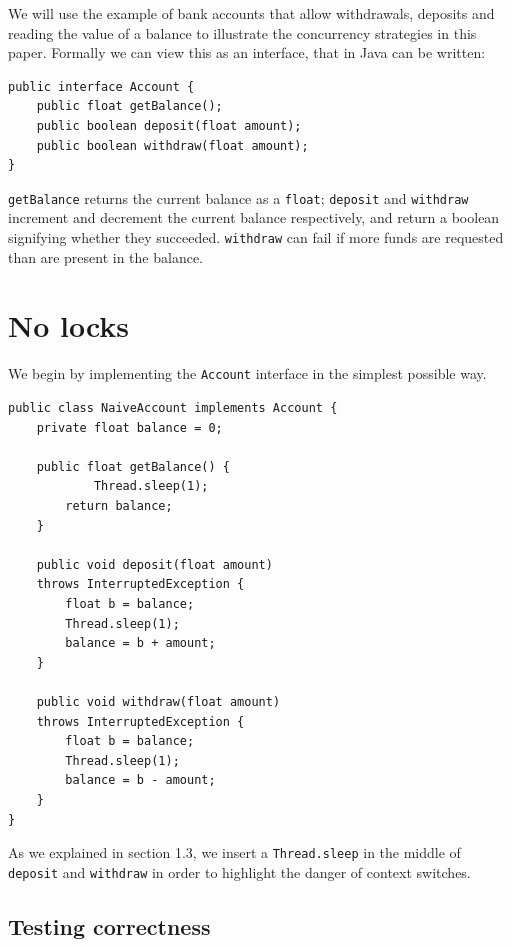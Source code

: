 \documentclass[a4paper,12pt]{kth-mag}
\begin{document}
We will use the example of bank accounts that allow withdrawals, deposits and reading the value of a balance to illustrate the concurrency strategies in this paper. Formally we can view this as an interface, that in Java can be written:

\begin{listing}[H]
	\begin{verbatim}
public interface Account {
    public float getBalance();
    public boolean deposit(float amount);
    public boolean withdraw(float amount);
}
  	\end{verbatim}
\end{listing}

\texttt{getBalance} returns the current balance as a \texttt{float}; \texttt{deposit} and \texttt{withdraw} increment and decrement the current balance respectively, and return a boolean signifying whether they succeeded. \texttt{withdraw} can fail if more funds are requested than are present in the balance.

\newpage

\section{No locks}

We begin by implementing the \texttt{Account} interface in the simplest possible way.

\begin{listing}[H]
	\begin{verbatim}
public class NaiveAccount implements Account {
    private float balance = 0;

    public float getBalance() {
    		Thread.sleep(1);
        return balance;
    }

    public void deposit(float amount) 
    throws InterruptedException {
        float b = balance;
        Thread.sleep(1);
        balance = b + amount;
    }

    public void withdraw(float amount) 
    throws InterruptedException {
        float b = balance;
        Thread.sleep(1);
        balance = b - amount;
    }
}  
	\end{verbatim}
\end{listing}

As we explained in section 1.3, we insert a \texttt{Thread.sleep} in the middle of \texttt{deposit} and \texttt{withdraw} in order to highlight the danger of context switches.

\subsection{Testing correctness}
\end{document}
